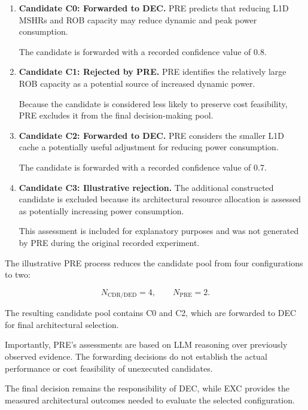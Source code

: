 \begin{enumerate}

\item \textbf{Candidate C0: Forwarded to DEC.}
PRE predicts that reducing L1D MSHRs
and ROB capacity may reduce dynamic
and peak power consumption.

The candidate is forwarded with
a recorded confidence value of 0.8.

\item \textbf{Candidate C1: Rejected by PRE.}
PRE identifies the relatively large
ROB capacity as a potential source
of increased dynamic power.

Because the candidate is considered
less likely to preserve cost feasibility,
PRE excludes it from the final
decision-making pool.

\item \textbf{Candidate C2: Forwarded to DEC.}
PRE considers the smaller L1D cache
a potentially useful adjustment
for reducing power consumption.

The candidate is forwarded with
a recorded confidence value of 0.7.

\item \textbf{Candidate C3: Illustrative rejection.}
The additional constructed candidate
is excluded because its architectural
resource allocation is assessed as
potentially increasing power consumption.

This assessment is included for
explanatory purposes and was not
generated by PRE during the original
recorded experiment.

\end{enumerate}

The illustrative PRE process reduces
the candidate pool from four
configurations to two:

\begin{equation}
N_{\mathrm{CDR/DED}} = 4,
\qquad
N_{\mathrm{PRE}} = 2.
\end{equation}

The resulting candidate pool contains
C0 and C2, which are forwarded to DEC
for final architectural selection.

Importantly, PRE's assessments are
based on LLM reasoning over previously
observed evidence. The forwarding
decisions do not establish the actual
performance or cost feasibility of
unexecuted candidates.

The final decision remains the
responsibility of DEC, while EXC
provides the measured architectural
outcomes needed to evaluate the
selected configuration.



